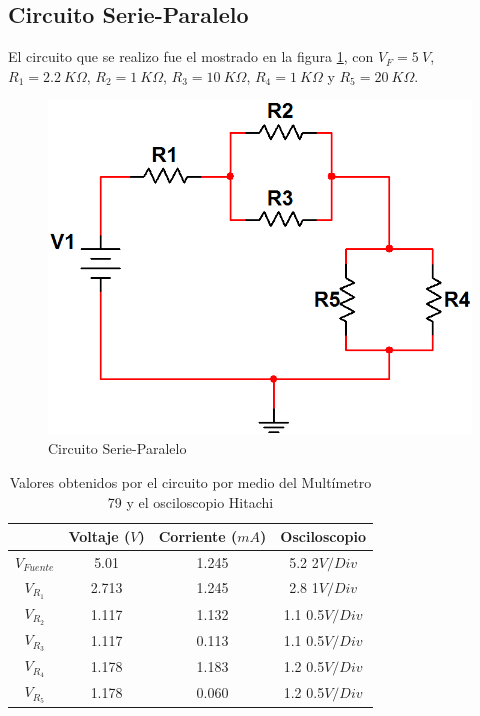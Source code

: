 \documentclass[twocolumn]{IEEEtran}
\begin{document}
\subsection{Circuito Serie-Paralelo}
\noindent
El circuito que se realizo fue el mostrado en la figura \ref{fig1}, con $V_{F}=5
\ V$, $R_{1}=2.2 \ K \Omega$, $R_{2}=1 \ K \Omega$, $R_{3}=10 \ K \Omega$,
$R_{4}=1 \ K \Omega$ y $R_{5}=20 \ K \Omega$.
\begin{figure}[H]
	\centering
		\includegraphics[scale=0.35]{circuit.png}
	\caption{Circuito Serie-Paralelo}
	\label{fig1}
\end{figure}
\noindent
\begin{table}[H]
	\centering
\begin{tabular}[c]{|c|c|c|c|} \hline
 & Voltaje ($V$) & Corriente ($mA$) & Osciloscopio \\ \hline
$V_{Fuente}$ & 5.01 & 1.245 & 5.2 2$V/Div$ \\ \hline
$V_{R_{1}}$ & 2.713 & 1.245 & 2.8 1$V/Div$ \\ \hline
$V_{R_{2}}$ & 1.117 & 1.132 & 1.1 0.5$V/Div$ \\ \hline
$V_{R_{3}}$ & 1.117 & 0.113 & 1.1 0.5$V/Div$ \\ \hline
$V_{R_{4}}$ & 1.178 & 1.183 & 1.2 0.5$V/Div$ \\ \hline
$V_{R_{5}}$ & 1.178 & 0.060 & 1.2 0.5$V/Div$ \\ \hline
\end{tabular}
	\caption{Valores obtenidos por el circuito por medio del Multímetro 79 y
el osciloscopio Hitachi}
	\label{tab4}
\end{table}
\noindent
\end{document}
